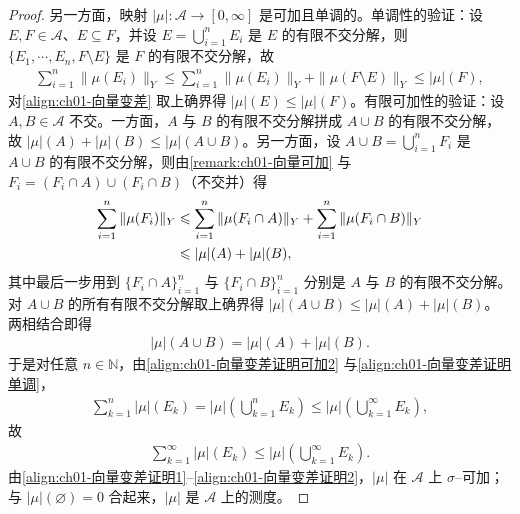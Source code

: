 \documentclass[../../main.tex]{subfiles}%
\begin{document}
\begin{proof}
另一方面，映射 $|\mu|:\mathcal{A}\to[0,\infty]$ 是可加且单调的。单调性的验证：设 $E,F\in\mathcal{A}$、$E\subseteq F$，并设 $E=\bigcup_{i=1}^n E_i$ 是 $E$ 的有限不交分解，则 $\{E_1,\cdots ,E_n,F\setminus E\}$ 是 $F$ 的有限不交分解，故
\begin{align}
\sum_{i=1}^n\|\mu(E_i)\|_Y\leqslant\sum_{i=1}^n\|\mu(E_i)\|_Y+\|\mu(F\setminus E)\|_Y\leqslant|\mu|(F), \label{align:ch01-向量变差证明单调}
\end{align}
对\eqref{align:ch01-向量变差} 取上确界得 $|\mu|(E)\leqslant|\mu|(F)$。有限可加性的验证：设 $A,B\in\mathcal{A}$ 不交。一方面，$A$ 与 $B$ 的有限不交分解拼成 $A\cup B$ 的有限不交分解，故 $|\mu|(A)+|\mu|(B)\leqslant|\mu|(A\cup B)$。另一方面，设 $A\cup B=\bigcup_{i=1}^n F_i$ 是 $A\cup B$ 的有限不交分解，则由\cref{remark:ch01-向量可加} 与 $F_i=(F_i\cap A)\cup(F_i\cap B)$（不交并）得
\begin{align}
\sum_{i=1}^n\|\mu(F_i)\|_Y
&\leqslant\sum_{i=1}^n\|\mu(F_i\cap A)\|_Y+\sum_{i=1}^n\|\mu(F_i\cap B)\|_Y\notag\\
&\leqslant|\mu|(A)+|\mu|(B), \label{align:ch01-向量变差证明可加}
\end{align}
其中最后一步用到 $\{F_i\cap A\}_{i=1}^n$ 与 $\{F_i\cap B\}_{i=1}^n$ 分别是 $A$ 与 $B$ 的有限不交分解。对 $A\cup B$ 的所有有限不交分解取上确界得 $|\mu|(A\cup B)\leqslant|\mu|(A)+|\mu|(B)$。两相结合即得
\begin{align}
|\mu|(A\cup B)=|\mu|(A)+|\mu|(B). \label{align:ch01-向量变差证明可加2}
\end{align}
于是对任意 $n\in\mathbb{N}$，由\eqref{align:ch01-向量变差证明可加2} 与\eqref{align:ch01-向量变差证明单调}，
\begin{align}
\sum_{k=1}^n|\mu|(E_k)=|\mu|\left(\bigcup_{k=1}^n E_k\right)\leqslant|\mu|\left(\bigcup_{k=1}^\infty E_k\right), \label{align:ch01-向量变差证明可加3}
\end{align}
故
\begin{align}
\sum_{k=1}^\infty|\mu|(E_k)\leqslant|\mu|\left(\bigcup_{k=1}^\infty E_k\right). \label{align:ch01-向量变差证明2}
\end{align}
由\eqref{align:ch01-向量变差证明1}--\eqref{align:ch01-向量变差证明2}，$|\mu|$ 在 $\mathcal{A}$ 上 $\sigma$--可加；与 $|\mu|(\varnothing)=0$ 合起来，$|\mu|$ 是 $\mathcal{A}$ 上的测度。
\end{proof}
\end{document}
